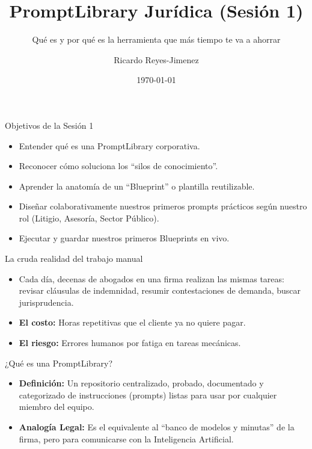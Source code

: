\documentclass[aspectratio=169]{beamer}
\title[ PromptLibrary Jurídica (Sesió]{ PromptLibrary Jurídica (Sesión 1)}
\subtitle{ Qué es y por qué es la herramienta que más tiempo te va a ahorrar}
\author{Ricardo Reyes-Jimenez}
\institute{Universidad de La Sabana}
\date{\today}
\begin{document}
\begin{frame}
  \titlepage
\end{frame}

\usebackgroundtemplate{}


\begin{frame}{Objetivos de la Sesión 1}

\begin{itemize}
  \item Entender qué es una PromptLibrary corporativa.
  \item Reconocer cómo soluciona los ``silos de conocimiento''.
  \item Aprender la anatomía de un ``Blueprint'' o plantilla reutilizable.
  \item Diseñar colaborativamente nuestros primeros prompts prácticos según nuestro rol (Litigio, Asesoría, Sector Público).
  \item Ejecutar y guardar nuestros primeros Blueprints en vivo.
\end{itemize}
\end{frame}

\begin{frame}{La cruda realidad del trabajo manual}

\begin{itemize}
  \item Cada día, decenas de abogados en una firma realizan las mismas tareas: revisar cláusulas de indemnidad, resumir contestaciones de demanda, buscar jurisprudencia.
  \item \textbf{El costo:} Horas repetitivas que el cliente ya no quiere pagar.
  \item \textbf{El riesgo:} Errores humanos por fatiga en tareas mecánicas.
\end{itemize}
\end{frame}

\begin{frame}{¿Qué es una PromptLibrary?}

\begin{itemize}
  \item \textbf{Definición:} Un repositorio centralizado, probado, documentado y categorizado de instrucciones (prompts) listas para usar por cualquier miembro del equipo.
  \item \textbf{Analogía Legal:} Es el equivalente al ``banco de modelos y minutas'' de la firma, pero para comunicarse con la Inteligencia Artificial.
\end{itemize}
\end{frame}
\end{document}

